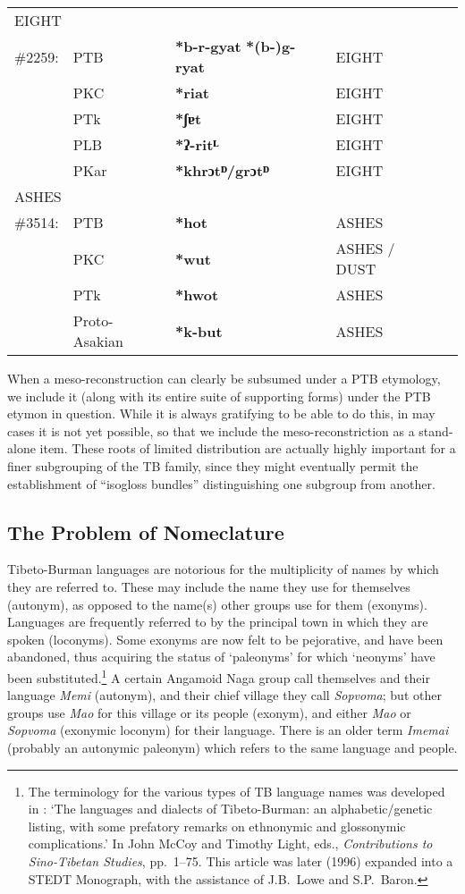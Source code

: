 \begin{tabular}{l l l l p{2in}}
\multicolumn{4}{l}{EIGHT} \\
\#2259: & PTB & \textbf{*b-r-gyat} \STEDTU{⪤} \textbf{*(b-)g-ryat} & EIGHT \\
 & PKC & \textbf{*riat} & EIGHT \\
 & PTk & \textbf{*ʃɐt} & EIGHT \\
 & PLB & \textbf{*ʔ-ritᴸ} & EIGHT \\
 & PKar & \textbf{*khrɔtᴰ/grɔtᴰ} & EIGHT \\


\multicolumn{4}{l}{ASHES} \\
\#3514: & PTB & \textbf{*hot} & ASHES \\
 & PKC & \textbf{*wut} & ASHES / DUST \\
 & PTk & \textbf{*hwot} & ASHES \\
 & Proto-Asakian & \textbf{*k-but} & ASHES \\

\end{tabular}

When a meso-reconstruction can clearly be subsumed under a PTB etymology, we include it (along with its entire suite of supporting forms) under the PTB etymon in question. 
While it is always gratifying to be able to do this, in may cases it is not yet possible, so that we include the meso-reconstriction as a stand-alone item. These roots of limited distribution are actually highly important for a finer subgrouping of the TB family, since they might eventually permit the establishment of “isogloss bundles” distinguishing one subgroup from another.

\subsection{The Problem of Nomeclature}

Tibeto-Burman languages are notorious for the multiplicity of names by which
they are referred to. These may include the name they use for themselves
(autonym), as opposed to the name(s) other groups use for them (exonyms). 
Languages are frequently referred to by the principal town in which they are
spoken (loconyms). Some exonyms are now felt to be pejorative, and have been
abandoned, thus acquiring the status of ‘paleonyms’ for which ‘neonyms’ have
been substituted.\footnote{The terminology for the various types of TB language
names was developed in \citealt{JAM-LDTB}: ‘The languages and dialects of
Tibeto-Burman: an alphabetic/genetic listing, with some prefatory remarks on
ethnonymic and glossonymic complications.’  In John McCoy and Timothy Light,
eds., \textit{Contributions to Sino-Tibetan Studies},  pp.~1–75. This article was later
(1996) expanded into a STEDT Monograph, with the assistance of J.B.\ Lowe and
S.P.\ Baron.} A certain Angamoid Naga group call themselves and their language
\textit{Memi} (autonym), and their chief village they call \textit{Sopvoma};
but other groups use \textit{Mao} for this village or its people (exonym), and either \textit{Mao}
or \textit{Sopvoma} (exonymic loconym) for their language. There is an older term \textit{Imemai} (probably an
autonymic paleonym) which refers to the same language and people.



